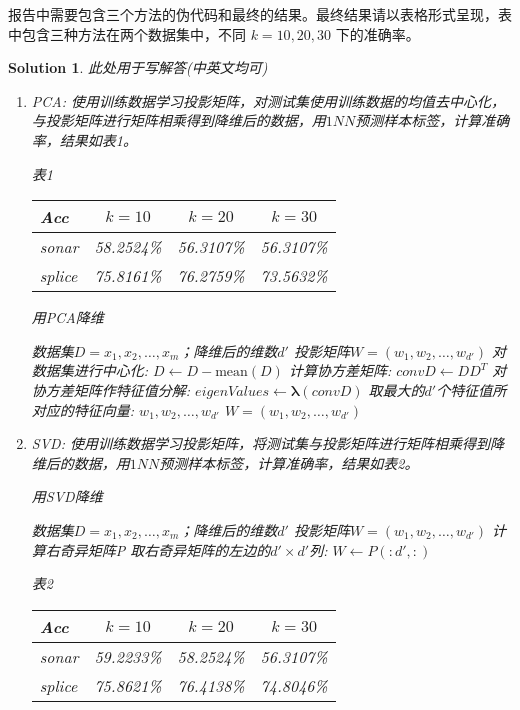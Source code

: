 \documentclass[a4paper,UTF8]{article}
\numberwithin{equation}{section}
\newtheorem*{solution}{Solution}
\begin{document}
	报告中需要包含三个方法的伪代码和最终的结果。最终结果请以表格形式呈现，表中包含三种方法在两个数据集中，不同 $k=10,20,30$ 下的准确率。
	
	
	\begin{solution}
		此处用于写解答(中英文均可)
		
		\begin{enumerate}
			\item PCA:
			\subitem 使用训练数据学习投影矩阵，对测试集使用训练数据的均值去中心化，与投影矩阵进行矩阵相乘得到降维后的数据，用$1NN$预测样本标签，计算准确率，结果如表1。
			\begin{center}
				表1 \\
			\begin{tabular}{l|c|c|c}
				Acc& $k=10$ & $k=20$ & $k=30$\\
				\hline
				sonar& 58.2524\%& 56.3107\%& 56.3107\%\\
				splice& 75.8161\%& 76.2759\%& 73.5632\%
			\end{tabular}
			\end{center}
			\begin{algorithm}
				\caption{用PCA降维}
				\begin{algorithmic}[1] %
					\Require 数据集$D={x_1,x_2,\ldots,x_m}$；降维后的维数$d'$
					\Ensure 投影矩阵$W=(w_1,w_2,\ldots,w_{d'})$
					\State 对数据集进行中心化: $D \leftarrow D - \text{mean}(D)$
					\State 计算协方差矩阵: $convD \leftarrow D D^{T}$  
					\State 对协方差矩阵作特征值分解: $eigenValues \leftarrow \bm{\lambda}(convD)$ 
					\State 取最大的$d'$个特征值所对应的特征向量: $w_1,w_2,\ldots,w_{d'}$ 
					\State \Return$W=(w_1,w_2,\ldots,w_{d'})$
					\EndFunction
				\end{algorithmic}
			\end{algorithm}
			
			
			\item SVD:
			\subitem 使用训练数据学习投影矩阵，将测试集与投影矩阵进行矩阵相乘得到降维后的数据，用$1NN$预测样本标签，计算准确率，结果如表2。
			\begin{algorithm}
				\caption{用SVD降维}
				\begin{algorithmic}[1] %
					\Require 数据集$D={x_1,x_2,\ldots,x_m}$；降维后的维数$d'$
					\Ensure 投影矩阵$W=(w_1,w_2,\ldots,w_{d'})$
					\Function {SVD}{$D, d'$}
					\State 计算右奇异矩阵P 
					\State 取右奇异矩阵的左边的$d'\times d'$列: $W \leftarrow P(:d',:)$  
					\State \Return{$W$}
					\EndFunction
				\end{algorithmic}
			\end{algorithm}
			\begin{center}
				表2 \\
			\begin{tabular}{l|c|c|c}
				Acc& $k=10$ & $k=20$ & $k=30$\\
				\hline
				sonar& 59.2233\%& 58.2524\%& 56.3107\%\\
				splice& 75.8621\%& 76.4138\%& 74.8046\%
			\end{tabular}
			\end{center}
			

\end{enumerate}
\end{solution}
\end{document}
